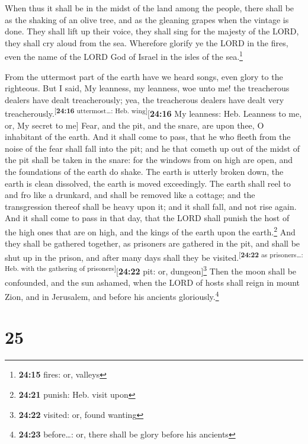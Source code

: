  When thus it shall be in the midst of the land among the
people, there shall be as the shaking of an olive tree, and as the
gleaning grapes when the vintage is done.  They shall
lift up their voice, they shall sing for the majesty of the LORD, they
shall cry aloud from the sea.  Wherefore glorify ye the
LORD in the fires, even the name of the LORD God of Israel in the isles
of the sea.\footnote{\textbf{24:15} fires: or, valleys}

 From the uttermost part of the earth have we heard
songs, even glory to the righteous. But I said, My leanness, my
leanness, woe unto me! the treacherous dealers have dealt treacherously;
yea, the treacherous dealers have dealt very
treacherously.\textsuperscript{{[}\textbf{24:16} uttermost\ldots: Heb.
wing{]}}{[}\textbf{24:16} My leanness: Heb. Leanness to me, or, My
secret to me{]}  Fear, and the pit, and the snare, are
upon thee, O inhabitant of the earth.  And it shall come
to pass, that he who fleeth from the noise of the fear shall fall into
the pit; and he that cometh up out of the midst of the pit shall be
taken in the snare: for the windows from on high are open, and the
foundations of the earth do shake.  The earth is utterly
broken down, the earth is clean dissolved, the earth is moved
exceedingly.  The earth shall reel to and fro like a
drunkard, and shall be removed like a cottage; and the transgression
thereof shall be heavy upon it; and it shall fall, and not rise again.
 And it shall come to pass in that day, that the LORD
shall punish the host of the high ones that are on high, and the kings
of the earth upon the earth.\footnote{\textbf{24:21} punish: Heb. visit
  upon}  And they shall be gathered together, as
prisoners are gathered in the pit, and shall be shut up in the prison,
and after many days shall they be
visited.\textsuperscript{{[}\textbf{24:22} as prisoners\ldots: Heb. with
the gathering of prisoners{]}}{[}\textbf{24:22} pit: or,
dungeon{]}\footnote{\textbf{24:22} visited: or, found wanting}
 Then the moon shall be confounded, and the sun ashamed,
when the LORD of hosts shall reign in mount Zion, and in Jerusalem, and
before his ancients gloriously.\footnote{\textbf{24:23} before\ldots:
  or, there shall be glory before his ancients}

\hypertarget{section-24}{%
\section{25}\label{section-24}}

